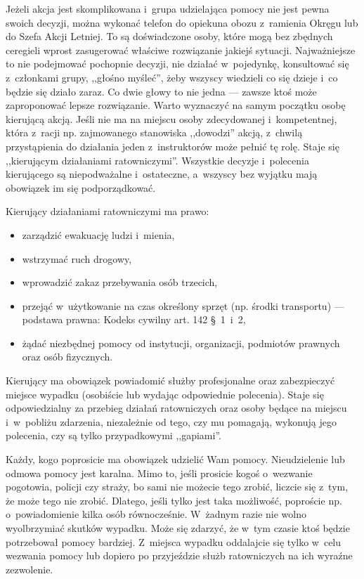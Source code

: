 \documentclass[a5paper,10pt,titlepage,twoside]{article}
\begin{document}
Jeżeli akcja jest skomplikowana i~grupa udzielająca pomocy nie jest pewna swoich decyzji, można wykonać telefon do opiekuna obozu z~ramienia Okręgu lub do Szefa Akcji Letniej. To są doświadczone osoby, które mogą bez zbędnych ceregieli wprost zasugerować właściwe rozwiązanie jakiejś sytuacji. Najważniejsze to nie podejmować pochopnie decyzji, nie działać w~pojedynkę, konsultować się z~członkami grupy, ,,głośno myśleć'', żeby wszyscy wiedzieli co się dzieje i~co będzie się działo zaraz. Co dwie głowy to nie jedna --- zawsze ktoś może zaproponować lepsze rozwiązanie. Warto wyznaczyć na samym początku osobę kierującą akcją. Jeśli nie ma na miejscu osoby zdecydowanej i~kompetentnej, która z~racji np. zajmowanego stanowiska ,,dowodzi'' akcją, z~chwilą przystąpienia do działania jeden z~instruktorów może pełnić tę rolę. Staje się ,,kierującym działaniami ratowniczymi''. Wszystkie decyzje i~polecenia kierującego są niepodważalne i~ostateczne, a~wszyscy bez wyjątku mają obowiązek im się podporządkować.

Kierujący działaniami ratowniczymi ma prawo:
\begin{itemize}
\item zarządzić ewakuację ludzi i~mienia,
\item wstrzymać ruch drogowy,
\item wprowadzić zakaz przebywania osób trzecich,
\item przejąć w~użytkowanie na czas określony sprzęt (np. środki transportu) --- podstawa prawna: Kodeks cywilny art. 142 \S~1~i~2,
\item żądać niezbędnej pomocy od instytucji, organizacji, podmiotów prawnych oraz osób fizycznych.
\end{itemize}
Kierujący ma obowiązek powiadomić służby profesjonalne oraz zabezpieczyć miejsce wypadku (osobiście lub wydając odpowiednie polecenia). Staje się odpowiedzialny za przebieg działań ratowniczych oraz osoby będące na miejscu i~w~pobliżu zdarzenia, niezależnie od tego, czy mu pomagają, wykonują jego polecenia, czy są tylko przypadkowymi ,,gapiami''.

Każdy, kogo poprosicie ma obowiązek udzielić Wam pomocy. Nieudzielenie lub odmowa pomocy jest karalna. Mimo to, jeśli prosicie kogoś o~wezwanie pogotowia, policji czy straży, bo sami nie możecie tego zrobić, liczcie się z~tym, że może tego nie zrobić. Dlatego, jeśli tylko jest taka możliwość, poproście np. o~powiadomienie kilka osób równocześnie. W~żadnym razie nie wolno wyolbrzymiać skutków wypadku. Może się zdarzyć, że w~tym czasie ktoś będzie potrzebował pomocy bardziej. Z~miejsca wypadku oddalajcie się tylko w~celu wezwania pomocy lub dopiero po przyjeździe służb ratowniczych na ich wyraźne zezwolenie.
\end{document}
